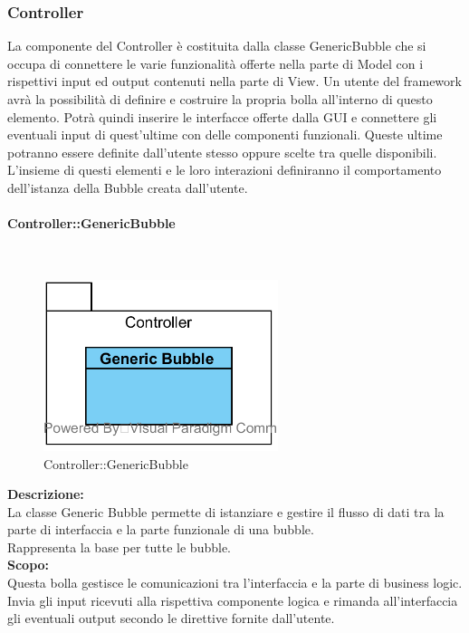\subsubsection{Controller}
La componente del Controller è costituita dalla classe Generic\-Bubble che si occupa di connettere le varie funzionalità offerte nella parte di Model con i rispettivi input ed output contenuti nella parte di View. Un utente del framework avrà la possibilità di definire e costruire la propria bolla all’interno di questo elemento. Potrà quindi inserire le interfacce offerte dalla GUI e connettere gli eventuali input di quest’ultime con delle componenti funzionali. Queste ultime potranno essere definite dall’utente stesso oppure scelte tra quelle disponibili. 
L’insieme di questi elementi e le loro interazioni definiranno il comportamento dell’istanza della Bubble creata dall’utente.
\begin{samepage}
\paragraph{Controller\-::Generic\-Bubble}\label{fm-generica}\mbox{}\\
\nopagebreak
\begin{figure}[H]
	\centering
	\includegraphics[height=5cm]{diagrammi_img/classi_e_package/bubble_generica.png}
	\caption{Controller\-::Generic\-Bubble}
\end{figure}
\end{samepage}
\textbf{Descrizione:}\\
La classe Generic Bubble permette di istanziare e gestire il flusso di dati tra la parte di interfaccia e la parte funzionale di una bubble.\\
Rappresenta la base per tutte le bubble. \\
\textbf{Scopo:}\\
Questa bolla gestisce le comunicazioni tra l'interfaccia e la parte di business logic. Invia gli input ricevuti alla rispettiva componente logica e rimanda all'interfaccia gli eventuali output secondo le direttive fornite dall'utente.\\
